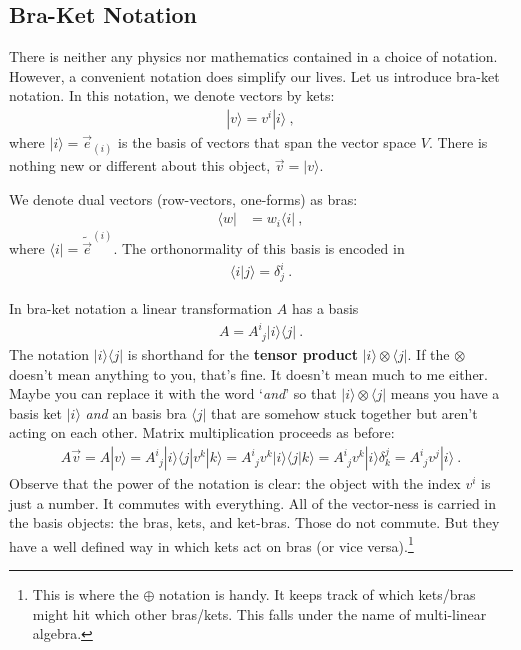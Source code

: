 \subsection{Bra-Ket Notation}

There is neither any physics nor mathematics contained in a choice of notation. However, a convenient notation does simplify our lives. Let us introduce bra-ket notation. In this notation, we denote vectors by kets:
\begin{align}
  |v\rangle = v^i|i\rangle \ ,
\end{align}
where $|i\rangle = \vec{e}_{(i)}$ is the basis of vectors that span the vector space $V$. There is nothing new or different about this object,  $\vec{v} = |v \rangle$.

We denote dual vectors (row-vectors, one-forms) as bras:
\begin{align}
  \langle w | &= w_i \langle i| \ ,
\end{align}
where $\langle i | = \tilde{\vec{e}}^{(i)}$. The orthonormality of this basis is encoded in 
\begin{align}
  \langle i | j \rangle = \delta^i_j \ .
\end{align}

In bra-ket notation a linear transformation $A$ has a basis
\begin{align}
  A = A^i_{\phantom{i}j} |i\rangle \langle j| \ .
\end{align}
The notation $|i\rangle \langle j|$ is shorthand for the \textbf{tensor product} $|i\rangle \otimes \langle j|$. If the $\otimes$ doesn’t mean anything to you, that’s fine. It doesn’t mean much to me either. Maybe you can replace it with the word `\emph{and}' so that $|i\rangle \otimes \langle j|$ means you have a basis ket $|i\rangle$ \emph{and} an basis bra $\langle j|$ that are somehow stuck together but aren't acting on each other. Matrix multiplication proceeds as before:
\begin{align}
  A\vec{v} = A|v\rangle = 
  A^i_{\phantom{i}j} |i\rangle \langle j| v^k |k \rangle
  = 
  A^i_{\phantom{i}j}  v^k  |i\rangle \langle j|k \rangle
  = 
  A^i_{\phantom{i}j}  v^k  |i\rangle \delta^j_k
  = 
  A^i_{\phantom{i}j}  v^j  |i\rangle \ .
\end{align}
Observe that the power of the notation is clear: the object with the index $v^i$ is just a number. It commutes with everything. All of the vector-ness is carried in the basis objects: the bras, kets, and ket-bras. Those do not commute. But they have a well defined way in which kets act on bras (or vice versa).\footnote{This is where the $\oplus$ notation is handy. It keeps track of which kets/bras might hit which other bras/kets. This falls under the name of multi-linear algebra.}



